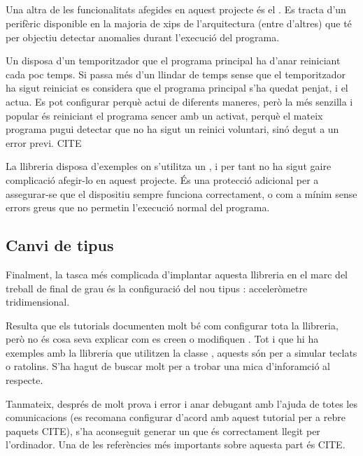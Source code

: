 \subsection{}

Una altra de les funcionalitats afegides en aquest projecte és el .
Es tracta d'un perifèric disponible en la majoria de xips de l'arquitectura
 (entre d'altres) que té per objectiu detectar anomalies durant
l'execució del programa.

Un  disposa d'un temporitzador que el programa principal ha d'anar
reiniciant cada poc temps. Si passa més d'un llindar de temps sense que el
temporitzador ha sigut reiniciat es considera que el programa principal s'ha
quedat penjat, i el  actua. Es pot configurar perquè actui de
diferents maneres, però la més senzilla i popular és reiniciant el programa
sencer amb un  activat, perquè el mateix programa pugui detectar que
no ha sigut un reinici voluntari, sinó degut a un error previ. CITE

La llibreria  disposa d'exemples on s'utilitza un , i
per tant no ha sigut gaire complicació afegir-lo en aquest projecte. És una
protecció adicional per a assegurar-se que el dispositiu sempre funciona
correctament, o com a mínim sense errors greus que no permetin l'execució
normal del programa.

\subsection{Canvi de tipus }

Finalment, la tasca més complicada d'implantar aquesta llibreria en el marc
del treball de final de grau és la configuració del nou tipus :
acceleròmetre tridimensional.

Resulta que els tutorials documenten molt bé com configurar tota la llibreria,
però no és cosa seva explicar com es creen o modifiquen .
Tot i que hi ha exemples amb la llibreria que utilitzen la classe ,
aquests són per a simular teclats o ratolins. S'ha hagut de buscar molt per a
trobar una mica d'inforamció al respecte.

Tanmateix, després de molt prova i error i anar debugant amb l'ajuda de
 totes les comunicacions (es recomana configurar 
d'acord amb aquest tutorial per a rebre paquets  CITE), s'ha aconseguit
generar un  que és correctament llegit per l'ordinador.
Una de les referències més importants sobre aquesta part és CITE.

